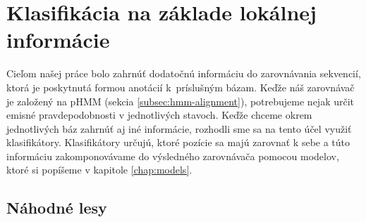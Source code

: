 \chapter[Klasifikácia]{Klasifikácia na základe lokálnej informácie}

Cieľom našej práce bolo zahrnúť dodatočnú informáciu do zarovnávania sekvencií, ktorá je poskytnutá formou anotácií k~príslušným bázam. Keďže náš zarovnávač je založený na pHMM (sekcia \ref{subsec:hmm-alignment}), potrebujeme nejak určit emisné pravdepodobnosti v jednotlivých stavoch. Keďže chceme okrem jednotlivých báz zahrnúť aj iné informácie, rozhodli sme sa na tento účel využiť klasifikátory. Klasifikátory určujú, ktoré pozície sa majú zarovnať k sebe a túto informáciu zakomponovávame do výsledného zarovnávača pomocou modelov, ktoré si popíšeme v kapitole \ref{chap:models}.

\section{Náhodné lesy}




